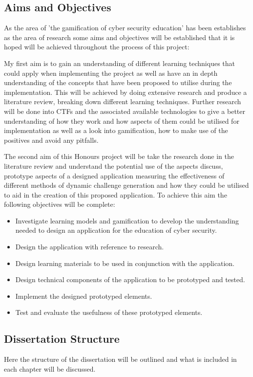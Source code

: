 \documentclass[12pt,a4paper]{article}
\begin{document}
\subsection{Aims and Objectives} 
As the area of 'the gamification of cyber security education' has been establishes as the area of research some aims and objectives will be established that it is hoped will be achieved throughout the process of this project:  

My first aim is to gain an understanding of different learning techniques that could apply when implementing the project as well as have an in depth understanding of the concepts that have been proposed to utilise during the implementation. This will be achieved by doing extensive research and produce a literature review, breaking down different learning techniques. Further research will be done into CTFs and the associated available technologies to give a better understanding of how they work and how aspects of them could be utilised for implementation as well as a look into gamification, how to make use of the positives and avoid any pitfalls.  

The second aim of this Honours project will be take the research done in the literature review and understand the potential use of the aspects discuss, prototype aspects of a designed application measuring the effectiveness of different methods of dynamic challenge generation and how they could be utilised to aid in the creation of this proposed application. To achieve this aim the following objectives will be complete:  

\begin{itemize}\itemsep0pt 
    \item Investigate learning models and gamification to develop the understanding needed to design an application for the education of cyber security.
	\item Design the application with reference to research.
	\item Design learning materials to be used in conjunction with the application.
	\item Design technical components of the application to be prototyped and tested. 
	\item Implement the designed prototyped elements. 
	\item Test and evaluate the usefulness of these prototyped elements.
\end{itemize}


\subsection{Dissertation Structure} 
Here the structure of the dissertation will be outlined and what is included in each chapter will be discussed. 
\end{document}
